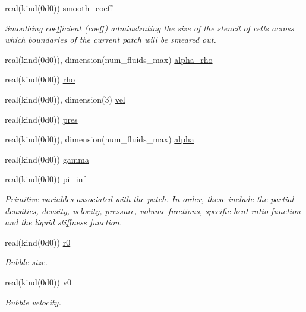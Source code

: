 \begin{DoxyCompactItemize}
real(kind(0d0)) \hyperlink{structm__derived__types_1_1ic__patch__parameters_a72c1ce27d5eb46084832a91e80ef6beb}{smooth\+\_\+coeff}
\begin{DoxyCompactList}\small\item\em Smoothing coefficient (coeff) adminstrating the size of the stencil of cells across which boundaries of the current patch will be smeared out. \end{DoxyCompactList}\item 
real(kind(0d0)), dimension(num\+\_\+fluids\+\_\+max) \hyperlink{structm__derived__types_1_1ic__patch__parameters_a528b19d32d95f0979ea3c55e369c92d1}{alpha\+\_\+rho}
\item 
real(kind(0d0)) \hyperlink{structm__derived__types_1_1ic__patch__parameters_ac282e81da07bd2bbcb5dbdb4de67e160}{rho}
\item 
real(kind(0d0)), dimension(3) \hyperlink{structm__derived__types_1_1ic__patch__parameters_a57f5280b8fd1f43a761d4450dea73d3f}{vel}
\item 
real(kind(0d0)) \hyperlink{structm__derived__types_1_1ic__patch__parameters_a9866745b3e2c38411f5b2d71783b5b26}{pres}
\item 
real(kind(0d0)), dimension(num\+\_\+fluids\+\_\+max) \hyperlink{structm__derived__types_1_1ic__patch__parameters_ab4d5d9af0cad8578dd224f486891dd4d}{alpha}
\item 
real(kind(0d0)) \hyperlink{structm__derived__types_1_1ic__patch__parameters_ac3b07552468d11b4edca7c706ce5bbcd}{gamma}
\item 
real(kind(0d0)) \hyperlink{structm__derived__types_1_1ic__patch__parameters_a0306de0dfe34028782b6f03a7441397a}{pi\+\_\+inf}
\begin{DoxyCompactList}\small\item\em Primitive variables associated with the patch. In order, these include the partial densities, density, velocity, pressure, volume fractions, specific heat ratio function and the liquid stiffness function. \end{DoxyCompactList}\item 
real(kind(0d0)) \hyperlink{structm__derived__types_1_1ic__patch__parameters_a9c130ddd7665f4d93e50dc40e59aa5e8}{r0}
\begin{DoxyCompactList}\small\item\em Bubble size. \end{DoxyCompactList}\item 
real(kind(0d0)) \hyperlink{structm__derived__types_1_1ic__patch__parameters_af858569859f61216c8c1afd41b044c5f}{v0}
\begin{DoxyCompactList}\small\item\em Bubble velocity. \end{DoxyCompactList}\end{DoxyCompactItemize}


